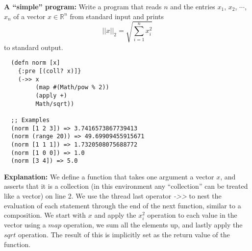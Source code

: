 \textbf{A ``simple'' program:} Write a program that reads $n$ and the entries $x_1$, $x_2$, $\cdots$, $x_n$ of a vector $x \in \mathbb{R}^n$ from standard input and prints \[||x||_2 = \sqrt{\sum_{i=1}^n x_i^2}\] to standard output.

\begin{verbatim}
  (defn norm [x]
    {:pre [(coll? x)]}
    (->> x
         (map #(Math/pow % 2))
         (apply +)
         Math/sqrt))

  ;; Examples
  (norm [1 2 3]) => 3.7416573867739413
  (norm (range 20)) => 49.69909455915671
  (norm [1 1 1]) => 1.7320508075688772
  (norm [1 0 0]) => 1.0
  (norm [3 4]) => 5.0
\end{verbatim}

{\color{blue}

\textbf{Explanation:} We define a function that takes one argument a vector $x$, and asserts that it is a collection (in this environment any ``collection'' can be treated like a vector) on line 2. We use the thread last operator \textit{->>} to nest the evaluation of each statement through the end of the next function, similar to a composition. We start with $x$ and apply the $x_i^2$ operation to each value in the vector using a $map$ operation, we sum all the elements up, and lastly apply the $sqrt$ operation. The result of this is implicitly set as the return value of the function.

}
